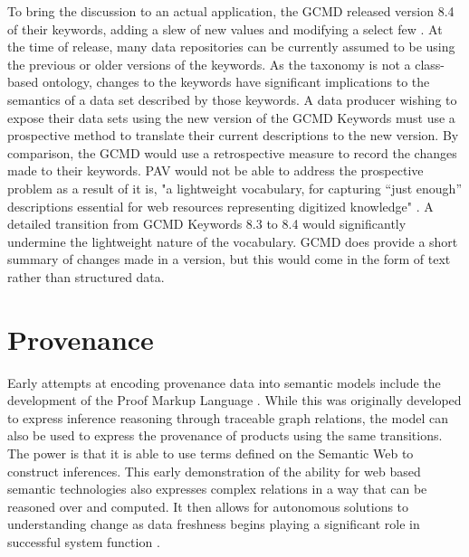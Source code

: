 To bring the discussion to an actual application, the GCMD released version 8.4 of their keywords, adding a slew of new values and modifying a select few \cite{Stevens2016}.
At the time of release, many data repositories can be currently assumed to be using the previous or older versions of the keywords.
As the taxonomy is not a class-based ontology, changes to the keywords have significant implications to the semantics of a data set described by those keywords.
A data producer wishing to expose their data sets using the new version of the GCMD Keywords must use a prospective method to translate their current descriptions to the new version.
By comparison, the GCMD would use a retrospective measure to record the changes made to their keywords.
PAV would not be able to address the prospective problem as a result of it is, "a lightweight vocabulary, for capturing “just enough” descriptions essential for web resources representing digitized knowledge" \cite{Ciccarese2013}.
A detailed transition from GCMD Keywords 8.3 to 8.4 would significantly undermine the lightweight nature of the vocabulary.
GCMD does provide a short summary of changes made in a version, but this would come in the form of text rather than structured data.

\section{Provenance}

Early attempts at encoding provenance data into semantic models include the development of the Proof Markup Language \cite{daSilva2006381}.
While this was originally developed to express inference reasoning through traceable graph relations, the model can also be used to express the provenance of products using the same transitions.
The power is that it is able to use terms defined on the Semantic Web to construct inferences.
This early demonstration of the ability for web based semantic technologies also expresses complex relations in a way that can be reasoned over and computed.
It then allows for autonomous solutions to understanding change as data freshness begins playing a significant role in successful system function \cite{Bouzeghoub:2004:FAD:1012453.1012464}.

